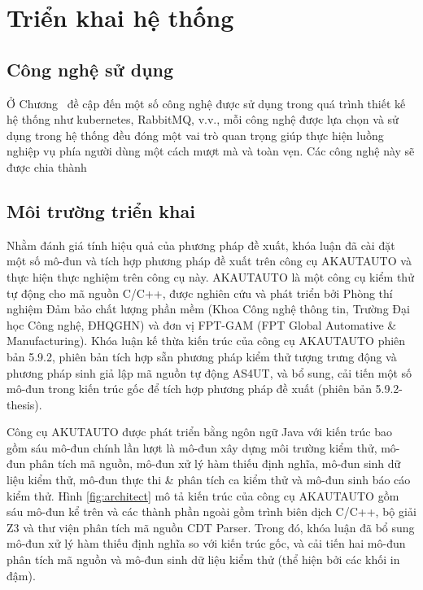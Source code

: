 \chapter{Triển khai hệ thống}\label{chap3}
\section{Công nghệ sử dụng} \label{sec:tehcnologies-used}
Ở Chương~ đề cập đến một số công nghệ được sử dụng trong quá trình thiết kế hệ thống như kubernetes, RabbitMQ, v.v., mỗi công nghệ được lựa chọn và sử dụng trong hệ thống đều đóng một vai trò quan trọng giúp thực hiện luồng nghiệp vụ phía người dùng một cách mượt mà và toàn vẹn.
Các công nghệ này sẽ được chia thành 
\section{Môi trường triển khai}\label{sec:deploy-environment}
Nhằm đánh giá tính hiệu quả của phương pháp đề xuất, khóa luận đã cài đặt một số mô-đun và tích hợp phương pháp đề xuất trên công cụ AKAUTAUTO và thực hiện thực nghiệm trên công cụ này. AKAUTAUTO là một công cụ kiểm thử tự động cho mã nguồn C/C++, được nghiên cứu và phát triển bởi Phòng thí nghiệm Đảm bảo chất lượng phần mềm (Khoa Công nghệ thông tin, Trường Đại học Công nghệ, ĐHQGHN) và đơn vị FPT-GAM (FPT Global Automative \& Manufacturing). Khóa luận kế thừa kiến trúc của công cụ AKAUTAUTO phiên bản 5.9.2, phiên bản tích hợp sẵn phương pháp kiểm thử tượng trưng động và phương pháp sinh giả lập mã nguồn tự động AS4UT, và bổ sung, cải tiến một số mô-đun trong kiến trúc gốc để tích hợp phương pháp đề xuất (phiên bản 5.9.2-thesis).

Công cụ AKUTAUTO được phát triển bằng ngôn ngữ Java với kiến trúc bao gồm sáu mô-đun chính lần lượt là mô-đun xây dựng môi trường kiểm thử, mô-đun phân tích mã nguồn, mô-đun xử lý hàm thiếu định nghĩa, mô-đun sinh dữ liệu kiểm thử, mô-đun thực thi \& phân tích ca kiểm thử và mô-đun sinh báo cáo kiểm thử. Hình \ref{fig:architect} mô tả kiến trúc của công cụ AKAUTAUTO gồm sáu mô-đun kể trên và các thành phần ngoài gồm trình biên dịch C/C++, bộ giải Z3 và thư viện phân tích mã nguồn CDT Parser. Trong đó, khóa luận đã bổ sung mô-đun xử lý hàm thiếu định nghĩa so với kiến trúc gốc, và cải tiến hai mô-đun phân tích mã nguồn và mô-đun sinh dữ liệu kiểm thử (thể hiện bởi các khối in đậm).

